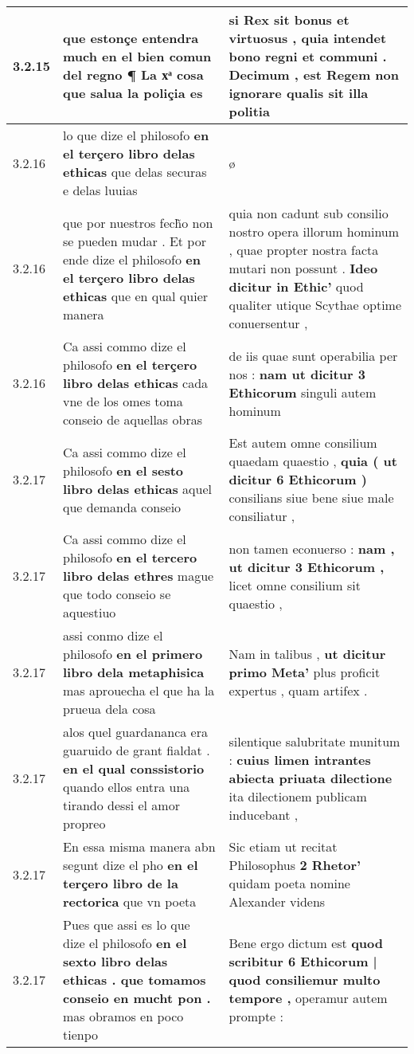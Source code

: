 \begin{tabular}{|p{1cm}|p{6.5cm}|p{6.5cm}|}
3.2.15 & que estonçe entendra much \textbf{ en el bien comun del regno ¶ } La xͣ cosa que salua la poliçia es & si Rex sit bonus et virtuosus , \textbf{ quia intendet bono regni et communi . } Decimum , est Regem non ignorare qualis sit illa politia \\\hline
3.2.16 & lo que dize el philosofo \textbf{ en el terçero libro delas ethicas } que delas securas e delas luuias & ø \\\hline
3.2.16 & que por nuestros fech̃o non se pueden mudar . Et por ende dize el philosofo \textbf{ en el terçero libro delas ethicas } que en qual quier manera & quia non cadunt sub consilio nostro opera illorum hominum , quae propter nostra facta mutari non possunt . \textbf{ Ideo dicitur in Ethic’ } quod qualiter utique Scythae optime conuersentur , \\\hline
3.2.16 & Ca assi commo dize el philosofo \textbf{ en el terçero libro delas ethicas } cada vne de los omes toma conseio de aquellas obras & de iis quae sunt operabilia per nos : \textbf{ nam ut dicitur 3 Ethicorum } singuli autem hominum \\\hline
3.2.17 & Ca assi commo dize el philosofo \textbf{ en el sesto libro delas ethicas } aquel que demanda conseio & Est autem omne consilium quaedam quaestio , \textbf{ quia ( ut dicitur 6 Ethicorum ) } consilians siue bene siue male consiliatur , \\\hline
3.2.17 & Ca assi commo dize el philosofo \textbf{ en el tercero libro delas ethres } mague que todo conseio se aquestiuo & non tamen econuerso : \textbf{ nam , ut dicitur 3 Ethicorum , } licet omne consilium sit quaestio , \\\hline
3.2.17 & assi conmo dize el philosofo \textbf{ en el primero libro dela metaphisica } mas aprouecha el que ha la prueua dela cosa & Nam in talibus , \textbf{ ut dicitur primo Meta’ } plus proficit expertus , quam artifex . \\\hline
3.2.17 & alos quel guardananca era guaruido de grant fialdat . \textbf{ en el qual conssistorio } quando ellos entra una tirando dessi el amor propreo & silentique salubritate munitum : \textbf{ cuius limen intrantes abiecta priuata dilectione } ita dilectionem publicam inducebant , \\\hline
3.2.17 & En essa misma manera abn segunt dize el pho \textbf{ en el terçero libro de la rectorica } que vn poeta & Sic etiam ut recitat Philosophus \textbf{ 2 Rhetor’ } quidam poeta nomine Alexander videns \\\hline
3.2.17 & Pues que assi es lo que dize el philosofo \textbf{ en el sexto libro delas ethicas . que tomamos conseio en mucht pon . } mas obramos en poco tienpo & Bene ergo dictum est \textbf{ quod scribitur 6 Ethicorum | quod consiliemur multo tempore , } operamur autem prompte : \\\hline

\end{tabular}
